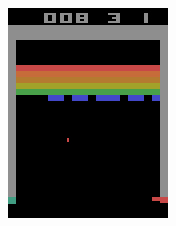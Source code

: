 \begin{figure}
\begin{subfigure}[h]{0.19\linewidth}
\includegraphics[width=\linewidth]{images/frame-sequence-1.png}
\end{subfigure}
\hfill
\begin{subfigure}[h]{0.19\linewidth}

\end{subfigure}
\end{figure}
